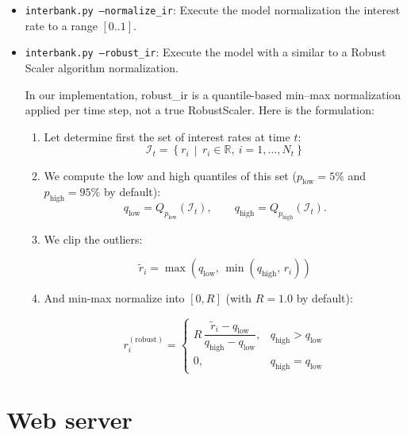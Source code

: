 \documentclass{article}
\begin{document}
\begin{itemize}
    \item \texttt{interbank.py --normalize\_ir}: Execute the model normalization the interest rate to a range $[0..1]$.
    \item \texttt{interbank.py --robust\_ir}: Execute the model with a similar to a Robust Scaler algorithm normalization.

    In our implementation, robust\_ir is a quantile-based min–max normalization applied per time step, not a true RobustScaler. Here is the formulation:
            \begin{enumerate}
                \item Let determine first the set of interest rates at time \(t\):
                \[
                \mathcal{I}_t = \left\{ r_i \,\middle|\, r_i \in \mathbb{R},\ i = 1,\dots,N_t \right\}
                \]

                \item We compute the low and high quantiles of this set (\(p_{\text{low}} = 5\%\) and \(p_{\text{high}} = 95\%\) by default):
                \[
                q_{\text{low}} = Q_{p_{\text{low}}}(\mathcal{I}_t),
                \qquad
                q_{\text{high}} = Q_{p_{\text{high}}}(\mathcal{I}_t).
                \]

                \item We clip the outliers:

                \[
                \tilde{r}_i = \max\!\left(q_{\text{low}},\, \min\!\left(q_{\text{high}},\, r_i\right)\right)
                \]

                \item And min-max normalize into  \([0, R]\) (with $R=1.0$ by default):

                \[
                r_i^{(\text{robust})} =
                \begin{cases}
                R \, \dfrac{\tilde{r}_i - q_{\text{low}}}{q_{\text{high}} - q_{\text{low}}}, & q_{\text{high}} > q_{\text{low}} \\[6pt]
                0, & q_{\text{high}} = q_{\text{low}}
                \end{cases}
                \]

            \end{enumerate}
           
\end{itemize}

\section{Web server}
\end{document}
